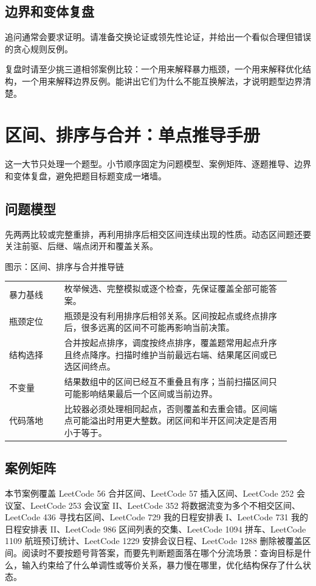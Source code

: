 \subsection{边界和变体复盘}

追问通常会要求证明。请准备交换论证或领先性论证，并给出一个看似合理但错误的贪心规则反例。

复盘时请至少挑三道相邻案例比较：一个用来解释暴力瓶颈，一个用来解释优化结构，一个用来解释边界反例。能讲出它们为什么不能互换解法，才说明题型边界清楚。

\section{区间、排序与合并：单点推导手册}
这一大节只处理一个题型。小节顺序固定为问题模型、案例矩阵、逐题推导、边界和变体复盘，避免把题目标题变成一堵墙。

\subsection{问题模型}

先两两比较或完整重排，再利用排序后相交区间连续出现的性质。动态区间题还要关注前驱、后继、端点闭开和覆盖关系。

\begin{principlebox}{图示：区间、排序与合并推导链}
\begin{tabular}{@{}p{0.18\linewidth}p{0.74\linewidth}@{}}
暴力基线 & 枚举候选、完整模拟或逐个检查，先保证覆盖全部可能答案。\\
瓶颈定位 & 瓶颈是没有利用排序后相邻关系。区间按起点或终点排序后，很多远离的区间不可能再影响当前决策。\\
结构选择 & 合并按起点排序，调度按终点排序，覆盖题常用起点升序且终点降序。扫描时维护当前最远右端、结果尾区间或已选区间终点。\\
不变量 & 结果数组中的区间已经互不重叠且有序；当前扫描区间只可能影响结果最后一个区间或当前边界。\\
代码落地 & 比较器必须处理相同起点，否则覆盖和去重会错。区间端点可能溢出时用更大整数。闭区间和半开区间决定是否用小于等于。\\
\end{tabular}
\end{principlebox}

\subsection{案例矩阵}

本节案例覆盖 LeetCode 56 合并区间、LeetCode 57 插入区间、LeetCode 252 会议室、LeetCode 253 会议室 II、LeetCode 352 将数据流变为多个不相交区间、LeetCode 436 寻找右区间、LeetCode 729 我的日程安排表 I、LeetCode 731 我的日程安排表 II、LeetCode 986 区间列表的交集、LeetCode 1094 拼车、LeetCode 1109 航班预订统计、LeetCode 1229 安排会议日程、LeetCode 1288 删除被覆盖区间。阅读时不要按题号背答案，而要先判断题面落在哪个分流场景：查询目标是什么，输入约束给了什么单调性或等价关系，暴力慢在哪里，优化结构保存了什么状态。

